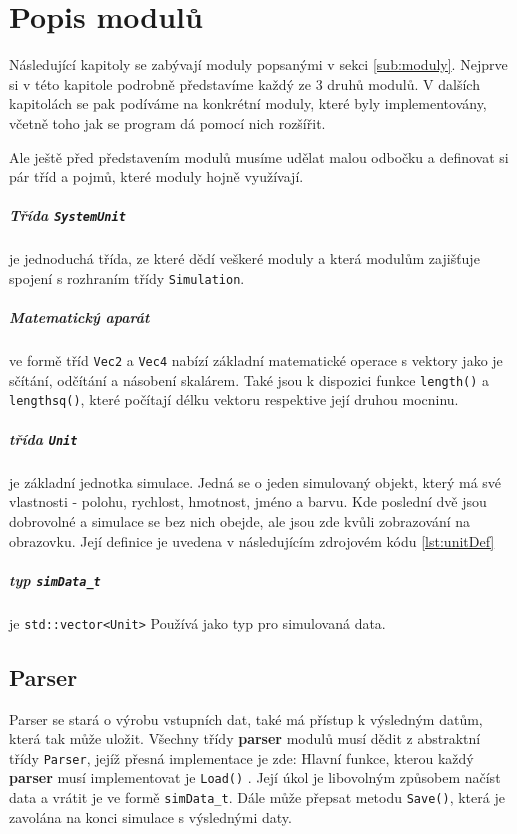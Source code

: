 \chapter{Popis modulů}
Následující kapitoly se zabývají moduly popsanými v sekci \ref{sub:moduly}.
Nejprve si v této kapitole podrobně představíme každý ze 3 druhů modulů.
V dalších kapitolách se pak podíváme na konkrétní moduly, které byly implementovány, včetně toho jak se program dá pomocí nich rozšířit.

Ale ještě před představením modulů musíme udělat malou odbočku a definovat si pár tříd a pojmů, které moduly hojně využívají.
\paragraph{Třída \texttt{SystemUnit}}
je jednoduchá třída, ze které dědí veškeré moduly a která modulům zajišťuje spojení s rozhraním třídy \texttt{Simulation}.
\paragraph{Matematický aparát}
ve formě tříd \texttt{Vec2} a \texttt{Vec4} nabízí základní matematické operace s vektory jako je sčítání, odčítání a násobení skalárem. Také jsou k dispozici funkce
\texttt{length()} a \texttt{lengthsq()}, které počítají délku vektoru respektive její druhou mocninu.
\paragraph{třída \texttt{Unit}}
je základní jednotka simulace. Jedná se o jeden simulovaný objekt, který má své vlastnosti - polohu, rychlost, hmotnost, jméno a barvu. Kde poslední dvě jsou dobrovolné a simulace se bez nich obejde, ale jsou zde kvůli zobrazování na obrazovku. Její definice je uvedena v následujícím zdrojovém kódu \ref{lst:unitDef}
\paragraph{typ \texttt{simData\_t}} je \texttt{std::vector<Unit>} Používá jako typ pro simulovaná data.
\section{Parser}
Parser se stará o výrobu vstupních dat, také má přístup k výsledným datům, která tak může uložit. Všechny třídy \textbf{parser} modulů musí dědit z abstraktní třídy \texttt{Parser}, jejíž přesná implementace je zde:
Hlavní funkce, kterou každý \textbf{parser} musí implementovat je \texttt{Load()} . Její úkol je libovolným způsobem načíst data a vrátit je ve formě \texttt{simData\_t}. Dále může přepsat metodu \texttt{Save()}, která je zavolána na konci simulace s výslednými daty.
